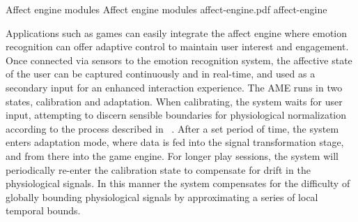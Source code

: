 \img
{Affect engine modules}
{Affect engine modules}
{affect-engine.pdf}
{affect-engine}





Applications such as games can easily integrate the affect engine where emotion recognition can offer adaptive control to maintain user interest and engagement. Once connected via sensors to the emotion recognition system, the affective state of the user can be captured continuously and in real-time, and used as a secondary input for an enhanced interaction experience. The AME runs in two states, calibration and adaptation. When calibrating, the system waits for user input, attempting to discern sensible boundaries for physiological normalization according to the process described in ~\cite{mandryk2007fuzzy}. After a set period of time, the system enters adaptation mode, where data is fed into the signal transformation stage, and from there into the game engine. For longer play sessions, the system will periodically re-enter the calibration state to compensate for drift in the physiological signals. In this manner the system compensates for the difficulty of globally bounding physiological signals by approximating a series of local temporal bounds.

